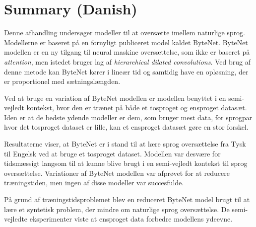 \chapter{Summary (Danish)}

Denne afhandling undersøger modeller til at oversætte imellem naturlige sprog. Modellerne er baseret på en fornyligt publiceret model kaldet ByteNet. ByteNet modellen er en ny tilgang til neural maskine oversættelse, som ikke er baseret på \textit{attention}, men istedet bruger lag af \textit{hierarchical dilated convolutions}. Ved brug af denne metode kan ByteNet kører i lineær tid og samtidig have en opløsning, der er proportionel med sætningslængden.

Ved at bruge en variation af ByteNet modellen er modellen benyttet i en semi-vejledt kontekst, hvor den er trænet på både et tosproget og ensproget datasæt. Iden er at de bedste ydende modeller er dem, som bruger mest data, for sprogpar hvor det tosproget dataset er lille, kan et ensproget datasæt gøre en stor forskel.

Resultaterne viser, at ByteNet er i stand til at lære sprog oversættelse fra Tysk til Engelsk ved at bruge et tosproget dataset. Modellen var desvære for tidsmæssigt langsom til at kunne blive brugt i en semi-vejledt kontekst til sprog oversættelse. Variationer af ByteNet modellen var afprøvet for at reducere træningstiden, men ingen af disse modeller var succesfulde.

På grund af træningstidsproblemet blev en reduceret ByteNet model brugt til at lære et syntetisk problem, der mindre om naturlige sprog oversættelse. De semi-vejledte eksperimenter viste at ensproget data forbedre modellens ydeevne.
